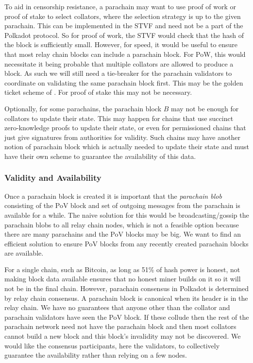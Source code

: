 To aid in censorship resistance, a parachain may want to use proof of work or proof of stake to select collators, where the selection strategy is up to the given parachain.
This can be implemented in the STVF and need not be a part of the Polkadot protocol. So for proof of work,
the STVF would check that the hash of the block is sufficiently small.
However, for speed, it would be useful to ensure that most relay chain blocks can include a parachain block.
For PoW, this would necessitate it being probable that multiple collators are allowed to produce a block.
As such we will still need a tie-breaker for the parachain validators to coordinate on validating the same parachain block first.
This may be the golden ticket scheme of \cite{2016:Wood:Polkadot}. For proof of stake this may not be necessary.

Optionally, for some parachains, the parachain block $B$ may not be enough for collators to update their state. This may happen for chains that use succinct zero-knowledge proofs to update their state, or even for permissioned chains that just give signatures from authorities for validity. Such chains may have another notion of parachain block which is actually needed to update their state and must have their own scheme to guarantee the availability of this data.





\subsubsection{Validity and Availability} \label{sec:validity-and-availability}
Once a parachain block is created it is important that the {\em parachain blob} consisting of the PoV block and set of outgoing messages from the parachain is available for a while.
The naive solution for this would be broadcasting/gossip the parachain blobs to all relay chain nodes, which is not a feasible option because there are many parachains and the PoV blocks may be big. We want to find an efficient solution to ensure PoV blocks from any recently created parachain blocks are available.

For a single chain, such as Bitcoin, as long as 51\% of hash power is honest, not making block data available ensures that no honest miner builds on it so it will not be in the final chain. However, parachain consensus in Polkadot is determined by relay chain consensus.
A parachain block is canonical when its header is in the relay chain.
We have no guarantees that anyone other than the collator and parachain validators have seen the PoV block.
If these collude then the rest of the parachain network need not have the parachain block and then most collators cannot build a new block and this block's invalidity may not be discovered. We would like the consensus participants, here the validators, to collectively guarantee the availability rather than relying on a few nodes.

